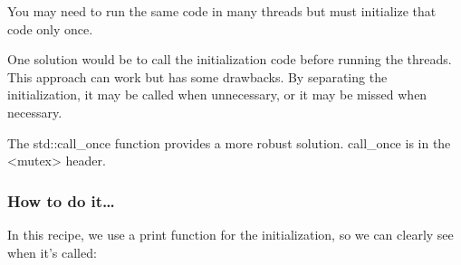 
You may need to run the same code in many threads but must initialize that code only once.

One solution would be to call the initialization code before running the threads. This approach can work but has some drawbacks. By separating the initialization, it may be called when unnecessary, or it may be missed when necessary.

The std::call\_once function provides a more robust solution. call\_once is in the <mutex> header.

\subsubsection{How to do it…}

In this recipe, we use a print function for the initialization, so we can clearly see when it's called:

